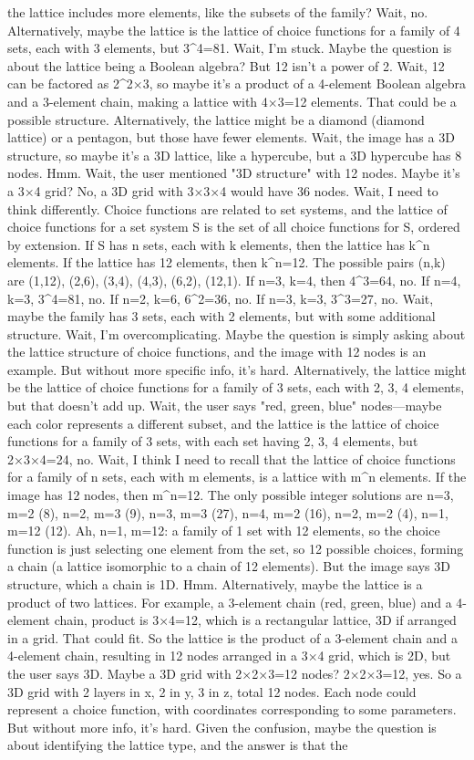 the lattice includes more elements, like the subsets of the family? Wait, no. Alternatively, maybe the lattice is the lattice of choice functions for a family of 4 sets, each with 3 elements, but 3^4=81. Wait, I'm stuck. Maybe the question is about the lattice being a Boolean algebra? But 12 isn't a power of 2. Wait, 12 can be factored as 2^2×3, so maybe it's a product of a 4-element Boolean algebra and a 3-element chain, making a lattice with 4×3=12 elements. That could be a possible structure. Alternatively, the lattice might be a diamond (diamond lattice) or a pentagon, but those have fewer elements. Wait, the image has a 3D structure, so maybe it's a 3D lattice, like a hypercube, but a 3D hypercube has 8 nodes. Hmm. Wait, the user mentioned "3D structure" with 12 nodes. Maybe it's a 3×4 grid? No, a 3D grid with 3×3×4 would have 36 nodes. Wait, I need to think differently. Choice functions are related to set systems, and the lattice of choice functions for a set system S is the set of all choice functions for S, ordered by extension. If S has n sets, each with k elements, then the lattice has k^n elements. If the lattice has 12 elements, then k^n=12. The possible pairs (n,k) are (1,12), (2,6), (3,4), (4,3), (6,2), (12,1). If n=3, k=4, then 4^3=64, no. If n=4, k=3, 3^4=81, no. If n=2, k=6, 6^2=36, no. If n=3, k=3, 3^3=27, no. Wait, maybe the family has 3 sets, each with 2 elements, but with some additional structure. Wait, I'm overcomplicating. Maybe the question is simply asking about the lattice structure of choice functions, and the image with 12 nodes is an example. But without more specific info, it's hard. Alternatively, the lattice might be the lattice of choice functions for a family of 3 sets, each with 2, 3, 4 elements, but that doesn't add up. Wait, the user says "red, green, blue" nodes—maybe each color represents a different subset, and the lattice is the lattice of choice functions for a family of 3 sets, with each set having 2, 3, 4 elements, but 2×3×4=24, no. Wait, I think I need to recall that the lattice of choice functions for a family of n sets, each with m elements, is a lattice with m^n elements. If the image has 12 nodes, then m^n=12. The only possible integer solutions are n=3, m=2 (8), n=2, m=3 (9), n=3, m=3 (27), n=4, m=2 (16), n=2, m=2 (4), n=1, m=12 (12). Ah, n=1, m=12: a family of 1 set with 12 elements, so the choice function is just selecting one element from the set, so 12 possible choices, forming a chain (a lattice isomorphic to a chain of 12 elements). But the image says 3D structure, which a chain is 1D. Hmm. Alternatively, maybe the lattice is a product of two lattices. For example, a 3-element chain (red, green, blue) and a 4-element chain, product is 3×4=12, which is a rectangular lattice, 3D if arranged in a grid. That could fit. So the lattice is the product of a 3-element chain and a 4-element chain, resulting in 12 nodes arranged in a 3×4 grid, which is 2D, but the user says 3D. Maybe a 3D grid with 2×2×3=12 nodes? 2×2×3=12, yes. So a 3D grid with 2 layers in x, 2 in y, 3 in z, total 12 nodes. Each node could represent a choice function, with coordinates corresponding to some parameters. But without more info, it's hard. Given the confusion, maybe the question is about identifying the lattice type, and the answer is that the 
